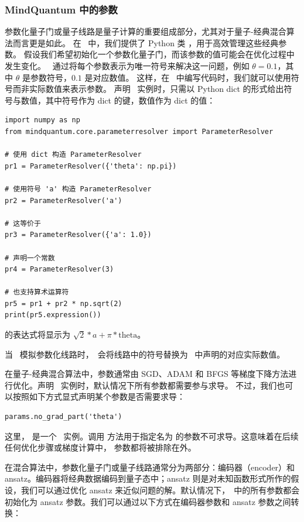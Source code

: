 \subsubsection{MindQuantum 中的参数}
参数化量子门或量子线路是量子计算的重要组成部分，尤其对于量子-经典混合算法而言更是如此。
在 \MindQuantum\ 中，我们提供了 Python 类 ，用于高效管理这些经典参数。
假设我们希望初始化一个参数化量子门，而该参数的值可能会在优化过程中发生变化。
\ParameterResolver\ 通过将每个参数表示为唯一符号来解决这一问题，例如 $\theta=0.1$，其中 $\theta$ 是参数符号，$0.1$ 是对应数值。
这样，在 \MindQuantum\ 中编写代码时，我们就可以使用符号而非实际数值来表示参数。
声明 \ParameterResolver\ 实例时，只需以 Python dict 的形式给出符号与数值，其中符号作为 dict 的键，数值作为 dict 的值：

\begin{lstlisting}
import numpy as np
from mindquantum.core.parameterresolver import ParameterResolver

# 使用 dict 构造 ParameterResolver
pr1 = ParameterResolver({'theta': np.pi})

# 使用符号 'a' 构造 ParameterResolver
pr2 = ParameterResolver('a')

# 这等价于
pr3 = ParameterResolver({'a': 1.0})

# 声明一个常数
pr4 = ParameterResolver(3)

# 也支持算术运算符
pr5 = pr1 + pr2 * np.sqrt(2)
print(pr5.expression())
\end{lstlisting}

 的表达式将显示为 $\sqrt{2}*a + \pi*\text{theta}$。

当 \MindQuantum\ 模拟参数化线路时，\ParameterResolver\ 会将线路中的符号替换为 \ParameterResolver\ 中声明的对应实际数值。

在量子-经典混合算法中，参数通常由 SGD、ADAM 和 BFGS 等梯度下降方法进行优化。声明 \ParameterResolver\ 实例时，默认情况下所有参数都需要参与求导。
不过，我们也可以按照如下方式显式声明某个参数是否需要求导：

\begin{lstlisting}
params.no_grad_part('theta')
\end{lstlisting}

这里， 是一个 \ParameterResolver\ 实例。调用  方法用于指定名为  的参数不可求导。这意味着在后续任何优化步骤或梯度计算中， 参数都将被排除在外。

在混合算法中，参数化量子门或量子线路通常分为两部分：编码器（encoder）和 ansatz。编码器将经典数据编码到量子态中；ansatz 则是对未知函数形式所作的假设，我们可以通过优化 ansatz 来近似问题的解。默认情况下，\ParameterResolver\ 中的所有参数都会初始化为 ansatz 参数。我们可以通过以下方式在编码器参数和 ansatz 参数之间转换：

